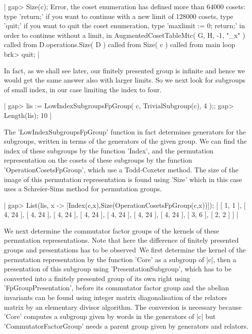 |    gap> Size(c);
    Error, the coset enumeration has defined more than 64000 cosets:
    type 'return;' if you want to continue with a new limit of
    128000 cosets,
    type 'quit;' if you want to quit the coset enumeration,
    type 'maxlimit := 0; return;' in order to continue without a limit,
     in
    AugmentedCosetTableMtc( G, H, -1, "_x" ) called from
    D.operations.Size( D ) called from
    Size( c ) called from
    main loop
    brk> quit; |

In fact, as we shall see later,  our finitely presented group is infinite
and  hence we would get the same answer also  with larger limits.  So  we
next look for subgroups of small index, in our case limiting the index to
four.

|    gap> lis := LowIndexSubgroupsFpGroup( c, TrivialSubgroup(c), 4 );;
    gap> Length(lis);
    10 |

The 'LowIndexSubgroupsFpGroup' function in fact determines generators for
the subgroups, written in terms of the generators of the given group.  We
can find the index  of  these subgroups  by the function 'Index', and the
permutation  representation  on  the cosets  of  these  subgroups by  the
function 'OperationCosetsFpGroup',  which use a Todd-Coxeter method.  The
size of  the image  of  this  permutation  representation is  found using
'Size'  which in this case uses a Schreier-Sims  method  for  permutation
groups.

|    gap> List(lis, x -> [Index(c,x),Size(OperationCosetsFpGroup(c,x))]);
    [ [ 1, 1 ], [ 4, 24 ], [ 4, 24 ], [ 4, 24 ], [ 4, 24 ], [ 4, 24 ],
      [ 4, 24 ], [ 4, 24 ], [ 3, 6 ], [ 2, 2 ] ] |

We next  determine  the commutator factor groups of  the kernels of these
permutation representations.   Note that  here the difference of finitely
presented  groups  and presentations  has  to  be  observed\:\  We  first
determine the  kernel of the  permutation representation by  the function
'Core' as a subgroup of  |c|, then a  presentation of this subgroup using
'PresentationSubgroup',  which  has  to  be  converted  into  a  finitely
presented  group of its own right using 'FpGroupPresentation', before its
commutator  factor  group and the abelian invariants  can  be found using
integer  matrix diagonalisation of the relators matrix  by  an elementary
divisor algorithm.  The conversion is necessary because 'Core' computes a
subgroup   given   by   words    in   the    generators    of   |c|   but
'CommutatorFactorGroup' needs  a  parent group  given  by generators  and
relators.

